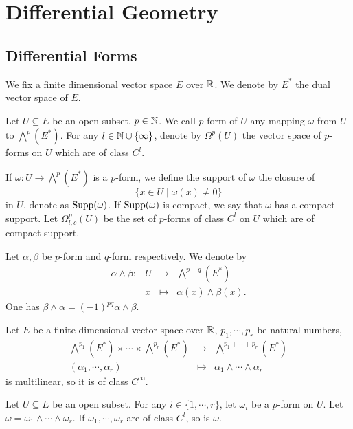 \chapter{Differential Geometry}


\section{Differential Forms}


We fix a finite dimensional vector space $E$ over $\mathbb{R}$.
We denote by $E^*$ the dual vector space of $E$.

\begin{definitionenv}
    Let $U \subseteq E$ be an open subset, $p \in \mathbb{N}$.
    We call $p$-form of $U$ any mapping $\omega$ from $U$ to $\bigwedge^p (E^*)$.
    For any $l \in \mathbb{N} \cup\{\infty\}$, denote by $\Omega^p(U)$ the vector space of $p$-forms on $U$ which are of class $C^l$.

    \quad If $\omega: U \rightarrow \bigwedge^p(E^*)$ is a $p$-form, we define the support of $\omega$ the closure of
    $$\{x \in U \mid \omega(x) \neq 0\}$$
    in $U$, denote as $\operatorname{\mathrm{Supp}}(\omega)$.
    If $\operatorname{\mathrm{Supp}}(\omega)$ is compact, we say that $\omega$ has a compact support.
    Let $\Omega_{l,c}^{p}(U)$ be the set of $p$-forms of class $C^l$ on $U$ which are of compact support.

    \quad Let $\alpha,\beta$ be $p$-form and $q$-form respectively.
    We denote by
    $$\begin{array}{rrcl}
        \alpha \wedge \beta : & U & \longrightarrow & \bigwedge^{p+q}(E^*)\\
        & x & \longmapsto & \alpha(x) \wedge \beta(x).
    \end{array}$$
    One has $\beta \wedge \alpha = (-1)^{pq} \alpha \wedge \beta$.
\end{definitionenv}

\begin{remark}
    Let $E$ be a finite dimensional vector space over $\mathbb{R}$,
    $p_1,\cdots,p_r$ be natural numbers,
    $$\begin{array}{rcl}
        \bigwedge^{p_1} (E^*) \times \cdots \times \bigwedge^{p_r} (E^*) & \longrightarrow & \bigwedge^{p_1+\cdots+p_r} (E^*)\\
        (\alpha_1,\cdots,\alpha_r) & \longmapsto & \alpha_1 \wedge \cdots \wedge \alpha_r
    \end{array}$$
    is multilinear, so it is of class $C^{\infty}$.

    Let $U \subseteq E$ be an open subset.
    For any $i \in \{1,\cdots,r\}$, let $\omega_i$ be a $p$-form on $U$.
    Let $\omega = \omega_1 \wedge \cdots \wedge \omega_r$.
    If $\omega_1,\cdots,\omega_r$ are of class $C^l$, so is $\omega$.
\end{remark}

